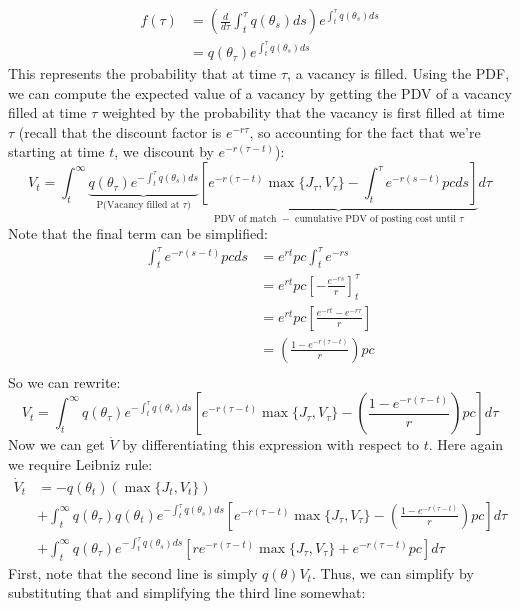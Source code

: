 \documentclass[12pt]{article}
\begin{document}
\begin{itemize}
    \[\begin{split}
        f(\tau) &= \left(\frac{d}{d\tau}\int_t^{\tau}q(\theta_s)ds\right)e^{\int_t^{\tau}q(\theta_s)ds} \\
        &= q(\theta_{\tau})e^{\int_t^{\tau}q(\theta_s)ds}
    \end{split}\]
    This represents the probability that at time $\tau$, a vacancy is filled. Using the PDF, we can compute the expected value of a vacancy by getting the PDV of a vacancy filled at time $\tau$ weighted by the probability that the vacancy is first filled at time $\tau$ (recall that the discount factor is $e^{-r\tau}$, so accounting for the fact that we're starting at time $t$, we discount by $e^{-r(\tau - t)}$):
    \[V_t = \int_t^{\infty} \underbrace{q(\theta_{\tau}) e^{-\int_t^{\tau}q(\theta_s)ds}}_{\text{P(Vacancy filled at $\tau$)}} \underbrace{\left[e^{-r(\tau - t)}\max \{J_{\tau}, V_{\tau}\} - \int_t^{\tau} e^{-r(s-t)}pcds\right]}_{\text{PDV of match $-$ cumulative PDV of posting cost until $\tau$}}d\tau\]
    Note that the final term can be simplified:
    \[\begin{split}
        \int_t^{\tau} e^{-r(s-t)}pcds &= e^{rt}pc\int_t^{\tau} e^{-rs} \\
        &= e^{rt}pc\left[-\frac{e^{-rs}}{r}\right]_t^{\tau} \\
        &= e^{rt}pc\left[\frac{e^{-rt} -e^{-r\tau}}{r}\right] \\
        &= \left(\frac{1 -e^{-r(\tau - t)}}{r}\right)pc \\
    \end{split}\]
    So we can rewrite:
    \[V_t = \int_t^{\infty} q(\theta_{\tau}) e^{-\int_t^{\tau}q(\theta_s)ds} \left[e^{-r(\tau - t)}\max \{J_{\tau}, V_{\tau}\} - \left(\frac{1 -e^{-r(\tau - t)}}{r}\right)pc\right]d\tau\]
    Now we can get $\dot{V}$ by differentiating this expression with respect to $t$. Here again we require Leibniz rule:
    \[\begin{split}
        \dot{V}_t &= -q(\theta_t)\left(\max \{J_t, V_t\}\right) \\
        &+\int_t^{\infty}q(\theta_{\tau}) q(\theta_t)e^{-\int_t^{\tau}q(\theta_s)ds} \left[e^{-r(\tau - t)}\max \{J_{\tau}, V_{\tau}\} - \left(\frac{1 -e^{-r(\tau - t)}}{r}\right)pc\right]d\tau \\
        &+\int_t^{\infty} q(\theta_{\tau}) e^{-\int_t^{\tau}q(\theta_s)ds} \left[re^{-r(\tau - t)}\max \{J_{\tau}, V_{\tau}\} +e^{-r(\tau - t)}pc\right]d\tau
    \end{split}\]
    First, note that the second line is simply $q(\theta)V_t$. Thus, we can simplify by substituting that and simplifying the third line somewhat:

\end{itemize}
\end{document}
